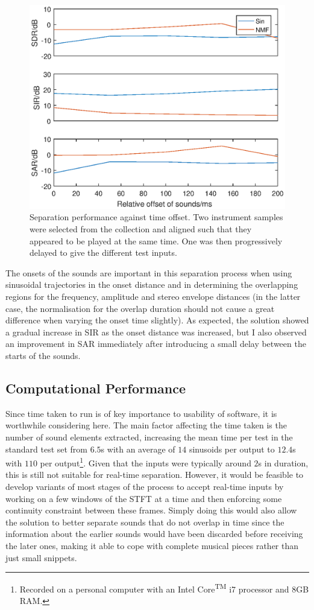 \documentclass[12pt,a4paper,twoside,openright]{report}
\begin{document}
\begin{figure}
\centering
\includegraphics[width=0.7\linewidth]{./OffsetPlot}
\caption[Separation performance against time offset.]{Separation performance against time offset. Two instrument samples were selected from the collection and aligned such that they appeared to be played at the same time. One was then progressively delayed to give the different test inputs.}
\label{fig:OffsetPlot}
\end{figure}

The onsets of the sounds are important in this separation process when using sinusoidal trajectories in the onset distance and in determining the overlapping regions for the frequency, amplitude and stereo envelope distances (in the latter case, the normalisation for the overlap duration should not cause a great difference when varying the onset time slightly). As expected, the solution showed a gradual increase in SIR as the onset distance was increased, but I also observed an improvement in SAR immediately after introducing a small delay between the starts of the sounds.

\subsection*{Computational Performance}

Since time taken to run is of key importance to usability of software, it is worthwhile considering here. The main factor affecting the time taken is the number of sound elements extracted, increasing the mean time per test in the standard test set from $ 6.5 $s with an average of $ 14 $ sinusoids per output to $ 12.4 $s with $ 110 $ per output\footnote{Recorded on a personal computer with an Intel\textsuperscript{\textregistered} Core\textsuperscript{TM} i7 processor and 8GB RAM.}. Given that the inputs were typically around $ 2 $s in duration, this is still not suitable for real-time separation. However, it would be feasible to develop variants of most stages of the process to accept real-time inputs by working on a few windows of the STFT at a time and then enforcing some continuity constraint between these frames. Simply doing this would also allow the solution to better separate sounds that do not overlap in time since the information about the earlier sounds would have been discarded before receiving the later ones, making it able to cope with complete musical pieces rather than just small snippets.
\end{document}
